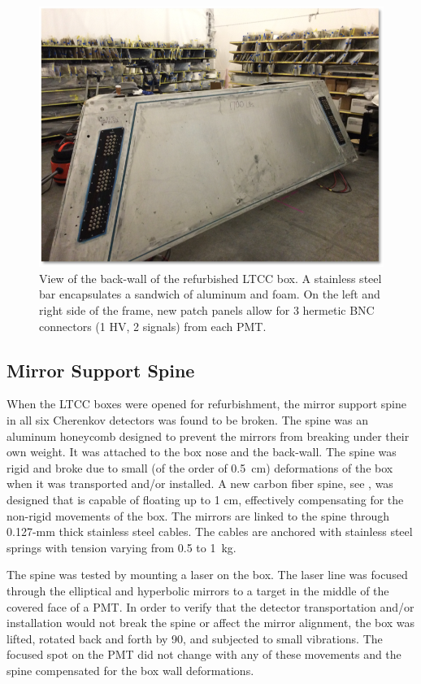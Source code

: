 \begin{figure}
	\centering
	\includegraphics[width=0.99\columnwidth,keepaspectratio]{img/backWall.png}
	\caption{View of the back-wall of the refurbished LTCC box. A stainless steel bar encapsulates a sandwich of
          aluminum and foam. On the left and right side of the frame, new patch panels allow for 3 hermetic BNC
          connectors (1 HV, 2 signals) from each PMT.}
	\label{fig:backWall}
\end{figure}

\subsection{Mirror Support Spine}

When the LTCC boxes were opened for refurbishment, the mirror support spine in all six Cherenkov detectors was
found to be broken. The spine was an aluminum honeycomb designed to prevent the mirrors from breaking under their
own weight. It was attached to the box nose and the back-wall. The spine was rigid and broke due to small (of the order
of 0.5~cm) deformations of the box when it was transported and/or installed. A new carbon fiber spine, see ,
was designed that is capable of floating up to 1 cm, effectively compensating for the non-rigid movements of the box.
The mirrors are linked to the spine through 0.127-mm thick stainless steel cables. The cables are anchored with stainless
steel springs with tension varying from 0.5 to 1~kg.

The spine was tested by mounting a laser on the box. The laser line was focused through the elliptical and hyperbolic
mirrors to a target in the middle of the covered face of a PMT. In order to verify that the detector transportation
and/or installation would not break the spine or affect the mirror alignment, the box was lifted, rotated back and
forth by 90\mdeg, and subjected to small vibrations. The focused spot on the PMT did not change with any of these
movements and the spine compensated for the box wall deformations.

